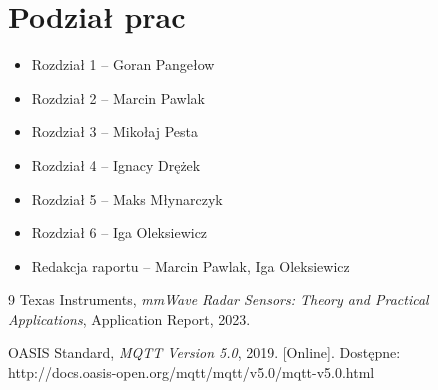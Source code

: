 \documentclass[14pt,a4paper]{extarticle}
\begin{document}
\section*{Podział prac}
\begin{itemize}
    \item Rozdział 1 -- Goran Pangełow
    \item Rozdział 2 -- Marcin Pawlak
    \item Rozdział 3 -- Mikołaj Pesta
    \item Rozdział 4 -- Ignacy Drężek
    \item Rozdział 5 -- Maks Młynarczyk
    \item Rozdział 6 -- Iga Oleksiewicz
    \item Redakcja raportu -- Marcin Pawlak, Iga Oleksiewicz 
\end{itemize}

\begin{thebibliography}{9}
Texas Instruments,
\textit{mmWave Radar Sensors: Theory and Practical Applications}, Application Report, 2023.

OASIS Standard,
\textit{MQTT Version 5.0}, 2019. [Online]. Dostępne: http://docs.oasis-open.org/mqtt/mqtt/v5.0/mqtt-v5.0.html
\end{thebibliography}
\end{document}
